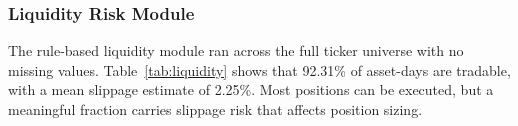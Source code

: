 \documentclass[conference]{IEEEtran}
\begin{document}
\subsubsection{Liquidity Risk Module}
The rule-based liquidity module ran across the full ticker universe with no missing values. Table~\ref{tab:liquidity} shows that 92.31\% of asset-days are tradable, with a mean slippage estimate of 2.25\%. Most positions can be executed, but a meaningful fraction carries slippage risk that affects position sizing.
\end{document}
